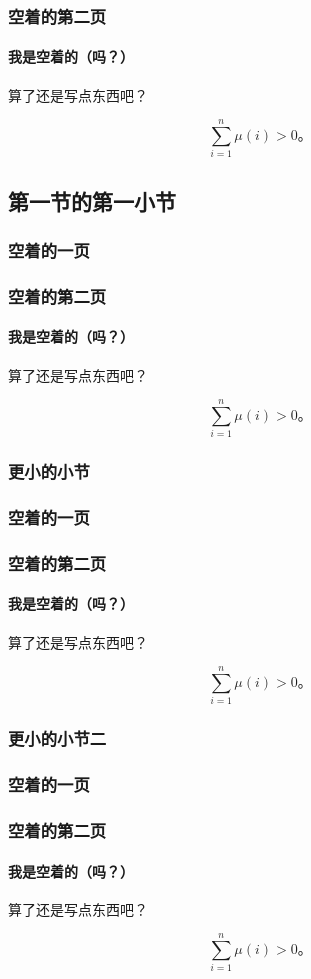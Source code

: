 \documentclass{../pkslide}
\begin{document}
\begin{frame}
  \frametitle{空着的第二页}
  \framesubtitle{我是空着的（吗？）}
  
  算了还是写点东西吧？
  
  \[ \sum_{i = 1}^{n} \mu(i) > 0 \text{。} \]
\end{frame}

\subsection{第一节的第一小节}

\begin{frame}
  \frametitle{空着的一页}
\end{frame}

\begin{frame}
  \frametitle{空着的第二页}
  \framesubtitle{我是空着的（吗？）}
  
  算了还是写点东西吧？
  
  \[ \sum_{i = 1}^{n} \mu(i) > 0 \text{。} \]
\end{frame}

\subsubsection{更小的小节}

\begin{frame}
  \frametitle{空着的一页}
\end{frame}

\begin{frame}
  \frametitle{空着的第二页}
  \framesubtitle{我是空着的（吗？）}
  
  算了还是写点东西吧？
  
  \[ \sum_{i = 1}^{n} \mu(i) > 0 \text{。} \]
\end{frame}

\subsubsection{更小的小节二}

\begin{frame}
  \frametitle{空着的一页}
\end{frame}

\begin{frame}
  \frametitle{空着的第二页}
  \framesubtitle{我是空着的（吗？）}
  
  算了还是写点东西吧？
  
  \[ \sum_{i = 1}^{n} \mu(i) > 0 \text{。} \]
\end{frame}
\end{document}
